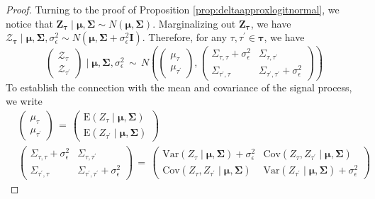 \begin{proof}
Turning to the proof of Proposition \ref{prop:deltaapproxlogitnormal}, 
we notice that $\mathbf{Z}_{\boldsymbol{\tau}}\mid \boldsymbol{\mu},\boldsymbol{\Sigma}\sim N(\boldsymbol{\mu},\boldsymbol{\Sigma})$. Marginalizing out $\mathbf{Z}_{\boldsymbol{\tau}}$, we have $\boldsymbol{\mathcal{Z}}_{\boldsymbol{\tau}}\mid \boldsymbol{\mu},\boldsymbol{\Sigma},\sigma_{\epsilon}^2\sim N(\boldsymbol{\mu},\boldsymbol{\Sigma}+\sigma_{\epsilon}^2\mathbf{I})$.
Therefore, for any $\tau,\tau^{\prime}\in\boldsymbol{\tau}$, we have
\begin{equation*}
    \begin{pmatrix}\mathcal{Z}_{\tau} \\ \mathcal{Z}_{\tau^{\prime}} \end{pmatrix}\mid \boldsymbol{\mu},\boldsymbol{\Sigma},\sigma_{\epsilon}^2 \,\sim\, N(\begin{pmatrix}
        \mu_{\tau} \\ \mu_{\tau^{\prime}}
    \end{pmatrix}, \begin{pmatrix}
        \Sigma_{\tau,\tau}+\sigma_{\epsilon}^2 & \Sigma_{\tau,\tau^{\prime}} \\ \Sigma_{\tau^{\prime},\tau} & \Sigma_{\tau^{\prime},\tau^{\prime}}+\sigma_{\epsilon}^2
    \end{pmatrix})
\end{equation*}
To establish the connection with the mean and covariance of the signal process, we write
\begin{align*}
    &\begin{pmatrix}
        \mu_{\tau} \\ \mu_{\tau^{\prime}}
    \end{pmatrix}\,=\,\begin{pmatrix}
        \text{E}(Z_{\tau}\mid \boldsymbol{\mu},\boldsymbol{\Sigma}) \\ \text{E}(Z_{\tau^{\prime}}\mid \boldsymbol{\mu},\boldsymbol{\Sigma})
    \end{pmatrix}\nonumber\\
    &\begin{pmatrix}
        \Sigma_{\tau,\tau}+\sigma_{\epsilon}^2 & \Sigma_{\tau,\tau^{\prime}} \\ \Sigma_{\tau^{\prime},\tau} & \Sigma_{\tau^{\prime},\tau^{\prime}}+\sigma_{\epsilon}^2
    \end{pmatrix}\,=\,
    \begin{pmatrix}
       \text{Var}(Z_{\tau}\mid\boldsymbol{\mu},\boldsymbol{\Sigma})+\sigma_{\epsilon}^2 & \text{Cov}(Z_{\tau},Z_{\tau^{\prime}}\mid\boldsymbol{\mu},\boldsymbol{\Sigma}) \\ \text{Cov}(Z_{\tau},Z_{\tau^{\prime}}\mid\boldsymbol{\mu},\boldsymbol{\Sigma}) & \text{Var}(Z_{\tau^{\prime}}\mid\boldsymbol{\mu},\boldsymbol{\Sigma})+\sigma_{\epsilon}^2
    \end{pmatrix}
\end{align*}


\end{proof}

